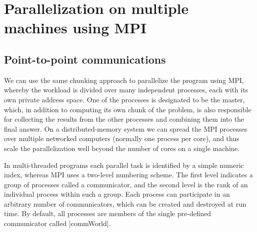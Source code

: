 \documentclass{tmr}
\begin{document}
\section{Parallelization on multiple machines using MPI}

\subsection{Point-to-point communications}

We can use the same chunking approach to parallelize the program
using MPI, whereby the workload is divided over many
independent processes, each with its own private address space.
One of the processes is designated to be the master,
which, in addition to computing its own chunk of the problem, is also responsible for
collecting the results from the other processes and combining them into the final answer.
On a distributed-memory system we can spread the MPI processes over
multiple networked computers (normally one process per core), and thus
scale the parallelization well beyond the number of cores on a single machine.

In multi-threaded programs each parallel task is identified by a simple
numeric index, whereas
MPI uses a two-level numbering scheme.
The first level indicates a group of processes called a communicator,
and the second level is the rank of an individual process within such a group.
Each process can participate in an arbitrary number of communicators,
which can be created and destroyed at run time. By default, all
processes are members of the single pre-defined communicator
called |commWorld|.
\end{document}
